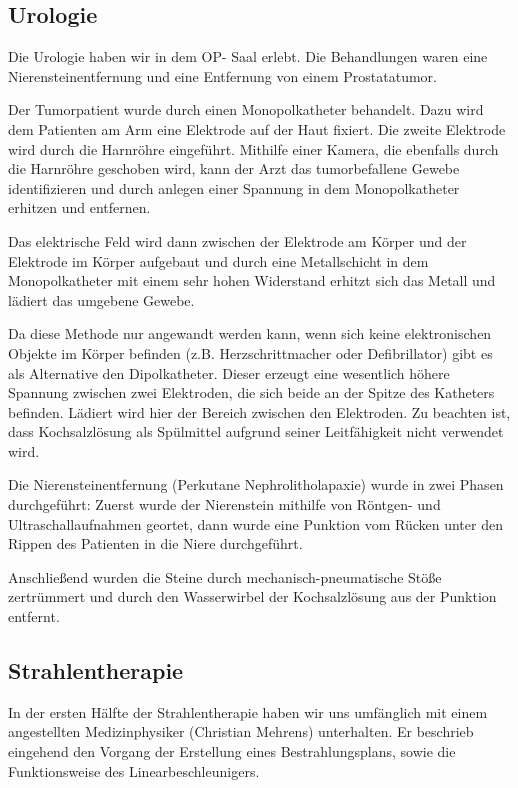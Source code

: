 \documentclass[11pt,a4paper,titlepage]{scrartcl}
\begin{document}
\subsection{Urologie}

Die Urologie haben wir in dem OP- Saal erlebt. Die Behandlungen waren eine Nierensteinentfernung und eine Entfernung von einem Prostatatumor. \medskip

Der Tumorpatient wurde durch einen Monopolkatheter behandelt. Dazu wird dem Patienten am Arm eine Elektrode auf der Haut fixiert. Die zweite Elektrode wird durch die Harnröhre eingeführt. Mithilfe einer Kamera, die ebenfalls durch die Harnröhre geschoben wird, kann der Arzt das tumorbefallene Gewebe identifizieren und durch anlegen einer Spannung in dem Monopolkatheter erhitzen und entfernen.\medskip

Das elektrische Feld wird dann zwischen der Elektrode am Körper und der Elektrode im Körper aufgebaut und durch eine Metallschicht in dem Monopolkatheter mit einem sehr hohen Widerstand erhitzt sich das Metall und lädiert das umgebene Gewebe.\medskip

Da diese Methode nur angewandt werden kann, wenn sich keine elektronischen Objekte im Körper befinden (z.B. Herzschrittmacher oder Defibrillator) gibt es als Alternative den Dipolkatheter. Dieser erzeugt eine wesentlich höhere Spannung zwischen zwei Elektroden, die sich beide an der Spitze des Katheters befinden. Lädiert wird hier der Bereich zwischen den Elektroden. Zu beachten ist, dass Kochsalzlösung als Spülmittel aufgrund seiner Leitfähigkeit nicht verwendet wird. \medskip

Die Nierensteinentfernung (Perkutane Nephrolitholapaxie) wurde in zwei Phasen durchgeführt: Zuerst wurde der Nierenstein mithilfe von Röntgen- und Ultraschallaufnahmen geortet, dann wurde eine Punktion vom Rücken unter den Rippen des Patienten in die Niere durchgeführt. \medskip

Anschließend wurden die Steine durch mechanisch-pneumatische Stöße zertrümmert und durch den Wasserwirbel der Kochsalzlösung aus der Punktion entfernt.



\subsection{Strahlentherapie}

In der ersten Hälfte der Strahlentherapie haben wir uns umfänglich mit einem angestellten Medizinphysiker (Christian Mehrens) unterhalten. Er beschrieb eingehend den Vorgang der Erstellung eines Bestrahlungsplans, sowie die Funktionsweise des Linearbeschleunigers. \medskip
\end{document}
